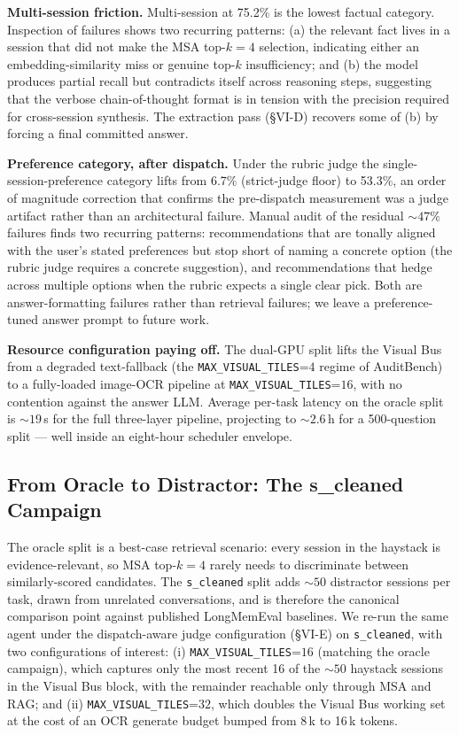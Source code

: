 \documentclass[conference]{IEEEtran}
\begin{document}
\textbf{Multi-session friction.} Multi-session at 75.2\% is the lowest factual category. Inspection of failures shows two recurring patterns: (a) the relevant fact lives in a session that did not make the MSA top-$k=4$ selection, indicating either an embedding-similarity miss or genuine top-$k$ insufficiency; and (b) the model produces partial recall but contradicts itself across reasoning steps, suggesting that the verbose chain-of-thought format is in tension with the precision required for cross-session synthesis. The extraction pass (\S VI-D) recovers some of (b) by forcing a final committed answer.

\textbf{Preference category, after dispatch.} Under the rubric judge the single-session-preference category lifts from 6.7\% (strict-judge floor) to 53.3\%, an order of magnitude correction that confirms the pre-dispatch measurement was a judge artifact rather than an architectural failure. Manual audit of the residual ${\sim}47\%$ failures finds two recurring patterns: recommendations that are tonally aligned with the user's stated preferences but stop short of naming a concrete option (the rubric judge requires a concrete suggestion), and recommendations that hedge across multiple options when the rubric expects a single clear pick. Both are answer-formatting failures rather than retrieval failures; we leave a preference-tuned answer prompt to future work.

\textbf{Resource configuration paying off.} The dual-GPU split lifts the Visual Bus from a degraded text-fallback (the \texttt{MAX\_VISUAL\_TILES}=$4$ regime of AuditBench) to a fully-loaded image-OCR pipeline at \texttt{MAX\_VISUAL\_TILES}=$16$, with no contention against the answer LLM. Average per-task latency on the oracle split is ${\sim}19$\,s for the full three-layer pipeline, projecting to ${\sim}2.6$\,h for a 500-question split --- well inside an eight-hour scheduler envelope.

\subsection{From Oracle to Distractor: The s\_cleaned Campaign}
\label{subsec:s-results}
The oracle split is a best-case retrieval scenario: every session in the haystack is evidence-relevant, so MSA top-$k=4$ rarely needs to discriminate between similarly-scored candidates. The \texttt{s\_cleaned} split adds ${\sim}50$ distractor sessions per task, drawn from unrelated conversations, and is therefore the canonical comparison point against published LongMemEval baselines. We re-run the same agent under the dispatch-aware judge configuration (\S VI-E) on \texttt{s\_cleaned}, with two configurations of interest: (i) \texttt{MAX\_VISUAL\_TILES}=$16$ (matching the oracle campaign), which captures only the most recent 16 of the ${\sim}50$ haystack sessions in the Visual Bus block, with the remainder reachable only through MSA and RAG; and (ii) \texttt{MAX\_VISUAL\_TILES}=$32$, which doubles the Visual Bus working set at the cost of an OCR generate budget bumped from 8\,k to 16\,k tokens.
\end{document}
